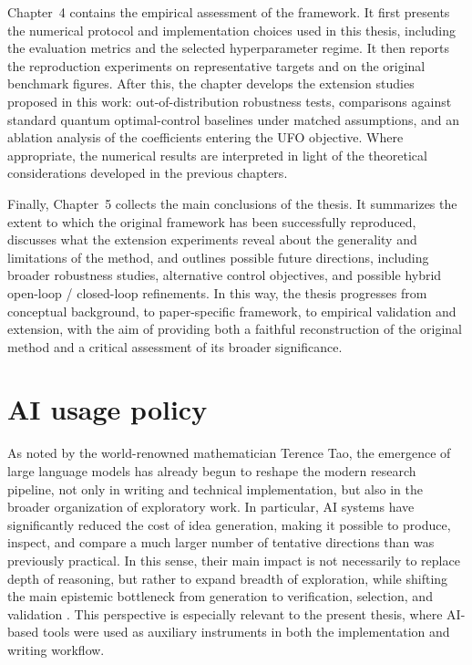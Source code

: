 Chapter~4 contains the empirical assessment of the framework. It first presents the numerical protocol and implementation choices used in this thesis, including the evaluation metrics and the selected hyperparameter regime. It then reports the reproduction experiments on representative targets and on the original benchmark figures. After this, the chapter develops the extension studies proposed in this work: out-of-distribution robustness tests, comparisons against standard quantum optimal-control baselines under matched assumptions, and an ablation analysis of the coefficients entering the UFO objective. Where appropriate, the numerical results are interpreted in light of the theoretical considerations developed in the previous chapters.

Finally, Chapter~5 collects the main conclusions of the thesis. It summarizes the extent to which the original framework has been successfully reproduced, discusses what the extension experiments reveal about the generality and limitations of the method, and outlines possible future directions, including broader robustness studies, alternative control objectives, and possible hybrid open-loop / closed-loop refinements. In this way, the thesis progresses from conceptual background, to paper-specific framework, to empirical validation and extension, with the aim of providing both a faithful reconstruction of the original method and a critical assessment of its broader significance.

\section{AI usage policy}
\label{subsec:intro_ai_usage_policy}

As noted by the world-renowned mathematician Terence Tao, the emergence of large language models has already begun to reshape the modern research pipeline, not only in writing and technical implementation, but also in the broader organization of exploratory work. In particular, AI systems have significantly reduced the cost of idea generation, making it possible to produce, inspect, and compare a much larger number of tentative directions than was previously practical. In this sense, their main impact is not necessarily to replace depth of reasoning, but rather to expand breadth of exploration, while shifting the main epistemic bottleneck from generation to verification, selection, and validation \cite{Tao2024MachineAssistedProof,Tao2026AIInterview}. This perspective is especially relevant to the present thesis, where AI-based tools were used as auxiliary instruments in both the implementation and writing workflow.

